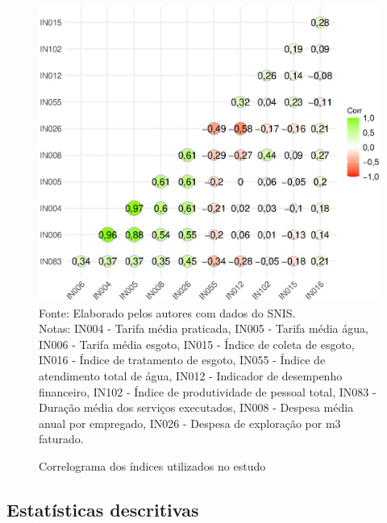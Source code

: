 \begin{figure}[H]
        \centering
        	\begin{minipage}{0.55\textwidth}	
                \caption{Correlograma dos índices utilizados no estudo}
                \label{f:corr}
                \includegraphics[scale=0.5]{figures/cor.eps}                 
            	\footnotesize \\
            		Fonte: Elaborado pelos autores com dados do SNIS. \\
            		Notas: IN004 - Tarifa média praticada,
				IN005 - Tarifa média água,
				IN006 - Tarifa média esgoto,		
				IN015 - Índice de coleta de esgoto,
				IN016 - Índice de tratamento de esgoto,
				IN055 - Índice de atendimento total de água,	
				IN012 - Indicador de desempenho financeiro,
				IN102 - Índice de produtividade de pessoal total,
				IN083 - Duração média dos serviços executados,	
				IN008 - Despesa média anual por empregado,
				IN026 - Despesa de exploração por m3 faturado.   	
	\end{minipage}
\end{figure}



\begin{multicols}{2}
\subsection{Estatísticas descritivas}



\end{multicols}

